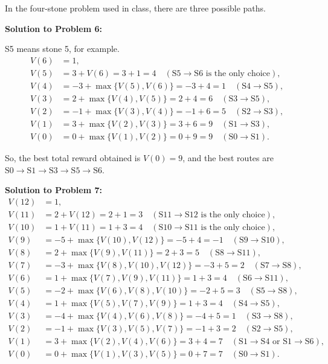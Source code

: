 \documentclass[a4paper, 12pt]{article}
\begin{document}
In the four-stone problem used in class, there are three possible paths.

\textbf{Solution to Problem 6:}

S5 means stone 5, for example.
%
\begin{align*}
V(6) &= 1,\\
%
V(5) &= 3 + V(6) = 3 + 1 = 4 \quad (\text{S}5 \to \text{S}6 \text{ is the only choice}),\\
%
V(4) &= -3 + \max\{ V(5), V(6) \} = -3 + 4 = 1 \quad (\text{S}4 \to \text{S}5),\\
%
V(3) &= 2 + \max\{ V(4), V(5) \} = 2 + 4 = 6 \quad (\text{S}3 \to \text{S}5),\\
%
V(2) &= -1 + \max\{ V(3), V(4) \} = -1 + 6 = 5 \quad (\text{S}2 \to \text{S}3),\\
%
V(1) &= 3 + \max\{ V(2), V(3) \} = 3 + 6 = 9 \quad (\text{S}1 \to \text{S}3),\\
%
V(0) &= 0 + \max\{ V(1), V(2) \} = 0 + 9 = 9 \quad (\text{S}0 \to \text{S}1).
\end{align*}

So, the best total reward obtained is $V(0) = 9$, and the best routes are $\text{S}0 \to \text{S}1 \to \text{S}3 \to \text{S}5 \to \text{S}6$.

\textbf{Solution to Problem 7:}
%
\begin{align*}
V(12) &= 1,\\
%
V(11) &= 2 + V(12) = 2 + 1 = 3 \quad (\text{S}11 \to \text{S}12 \text{ is the only choice}),\\
%
V(10) &= 1 + V(11) = 1 + 3 = 4 \quad (\text{S}10 \to \text{S}11 \text{ is the only choice}),\\
%
V(9) &= -5 + \max\{ V(10), V(12) \} = -5 + 4 = -1 \quad (\text{S}9 \to \text{S}10),\\
%
V(8) &= 2 + \max\{ V(9), V(11) \} = 2 + 3 = 5 \quad (\text{S}8 \to \text{S}11),\\
%
V(7) &= -3 + \max\{ V(8), V(10), V(12) \} = -3 + 5 = 2 \quad (\text{S}7 \to \text{S}8),\\
%
V(6) &= 1 + \max\{ V(7), V(9), V(11) \} = 1 + 3 = 4 \quad (\text{S}6 \to \text{S}11),\\
%
V(5) &= -2 + \max\{ V(6), V(8), V(10) \} = -2 + 5 = 3 \quad (\text{S}5 \to \text{S}8),\\
%
V(4) &= 1 + \max\{ V(5), V(7), V(9) \} = 1 + 3 = 4 \quad (\text{S}4 \to \text{S}5),\\
%
V(3) &= -4 + \max\{ V(4), V(6), V(8) \} = -4 + 5 = 1 \quad (\text{S}3 \to \text{S}8),\\
%
V(2) &= -1 + \max\{ V(3), V(5), V(7) \} = -1 + 3 = 2 \quad (\text{S}2 \to \text{S}5),\\
%
V(1) &= 3 + \max\{ V(2), V(4), V(6) \} = 3 + 4 = 7 \quad (\text{S}1 \to \text{S}4 \text{ or } \text{S}1 \to \text{S}6),\\
%
V(0) &= 0 + \max\{ V(1), V(3), V(5) \} = 0 + 7 = 7 \quad (\text{S}0 \to \text{S}1).
\end{align*}
\end{document}
